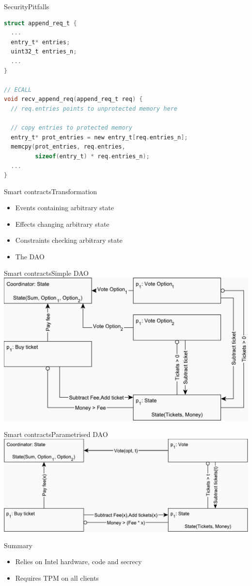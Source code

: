 \documentclass{beamer}
\begin{document}
\begin{frame}[fragile]{Security}{Pitfalls}%
  \vfill
  \begin{lstlisting}[language=C, basicstyle=\footnotesize\ttfamily, keywordstyle=\color{mLightBrown}, commentstyle=\color{gray}]
struct append_req_t {
  ...
  entry_t* entries;
  uint32_t entries_n;
  ...
}

// ECALL
void recv_append_req(append_req_t req) {
  // req.entries points to unprotected memory here

  // copy entries to protected memory
  entry_t* prot_entries = new entry_t[req.entries_n];
  memcpy(prot_entries, req.entries,
         sizeof(entry_t) * req.entries_n);
  ...
}
  \end{lstlisting}
  \vfill
\end{frame}

\begin{frame}{Smart contracts}{Transformation}%
    \begin{itemize}
    	\item Events containing arbitrary state
    	\vfill
    	\item Effects changing arbitrary state
    	\vfill
    	\item Constraints checking arbitrary state
    	\vfill
    	\item The DAO
    \end{itemize}
\end{frame}

\begin{frame}{Smart contracts}{Simple DAO}
	\centering
	\includegraphics[scale=0.5]{figures/dao-simple.pdf}
\end{frame}

\begin{frame}{Smart contracts}{Parametrised DAO}
	\centering
	\includegraphics[scale=0.5]{figures/dao-parametrised.pdf}
\end{frame}

\begin{frame}{Summary}%
	\begin{itemize}
		\item Relies on Intel hardware, code and secrecy
		\item Requires TPM on all clients
	\end{itemize}
\end{frame}
\end{document}
